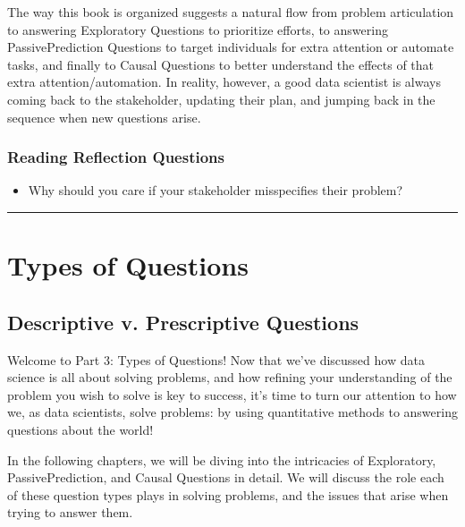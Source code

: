 \documentclass[letterpaper,10pt,english]{jupyterBook}
\begin{document}
\sphinxAtStartPar
The way this book is organized suggests a natural flow from problem articulation to answering Exploratory Questions to prioritize efforts, to answering Passive\sphinxhyphen{}Prediction Questions to target individuals for extra attention or automate tasks, and finally to Causal Questions to better understand the effects of that extra attention/automation. In reality, however, a good data scientist is always coming back to the stakeholder, updating their plan, and jumping back in the sequence when new questions arise.


\section{Reading Reflection Questions}
\label{\detokenize{20_problems_to_questions/20_stakeholder_management:reading-reflection-questions}}\begin{itemize}
\item {} 
\sphinxAtStartPar
Why should you care if your stakeholder misspecifies their problem?

\end{itemize}


\bigskip\hrule\bigskip


\sphinxstepscope


\part{Types of Questions}

\sphinxstepscope


\chapter{Descriptive v. Prescriptive Questions}
\label{\detokenize{30_questions/05_descriptive_v_prescriptive:descriptive-v-prescriptive-questions}}\label{\detokenize{30_questions/05_descriptive_v_prescriptive::doc}}
\sphinxAtStartPar
Welcome to Part 3: Types of Questions! Now that we’ve discussed how data science is all about solving problems, and how refining your understanding of the problem you wish to solve is key to success, it’s time to turn our attention to how we, as data scientists, solve problems: by using quantitative methods to answering questions about the world!

\sphinxAtStartPar
In the following chapters, we will be diving into the intricacies of Exploratory, Passive\sphinxhyphen{}Prediction, and Causal Questions in detail. We will discuss the role each of these question types plays in solving problems, and the issues that arise when trying to answer them.
\end{document}
